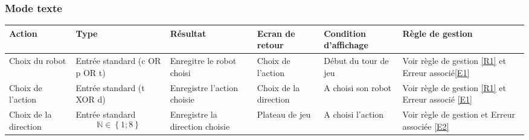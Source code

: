 \documentclass[12pt,a4paper]{article}
\begin{document}
\begin{itemize}
			\subsubsection{Mode texte}
					\hspace{-3cm}
					\begin{tabular}{|p{2.5cm}|p{2cm}|p{3cm}|p{2.5cm}|p{3cm}|p{3cm}|} %
						\hline
						Action 					& Type 							& Résultat              		& Ecran de retour   		& Condition d'affichage & Règle de gestion \\
						\hline \hline
						Choix du robot			& Entrée standard (c OR p OR t) & Enregitre le robot choisi		& Choix de l'action 		& Début du tour de jeu 	& Voir règle de gestion \ref{R1} et Erreur associé\ref{E1}			\\
						\hline
						Choix de l'action 		& Entrée standard (t XOR d) 		& Enregistre l'action choisie 	& Choix de la direction 	& A choisi son robot	& Voir règle de gestion \ref{R1}  et Erreur associé \ref{E1}			\\
						\hline
						Choix de la direction 	& Entrée standard $$\mathbb{N} \in \left\{1;8\right\}$$ & Enregistre la direction choisie & Plateau de jeu	& A choisi l'action	&  Voir règle de gestion et Erreur associée \ref{E2} 		\\
						\hline
					\end{tabular}
					\label{Action possible sur l'écran de jeu texte}

\end{itemize}
\end{document}
